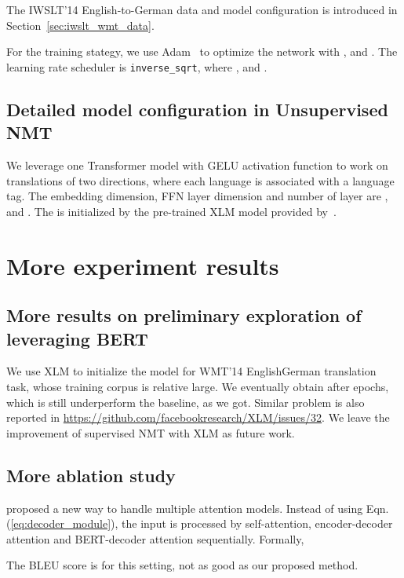 \documentclass{article} \usepackage{iclr2020_conference,times}
\newcommand{\myeqref}[1]{Eqn.(\ref{#1})}
\begin{document}
The IWSLT'14 English-to-German data and model configuration is introduced in Section~\ref{sec:iwslt_wmt_data}.

For the training stategy, we use Adam~\citep{kingma2014adam} to optimize the network with ,  and . The learning rate scheduler is \texttt{inverse\_sqrt}, where ,  and .




\subsection{Detailed model configuration in Unsupervised NMT}\label{app:unsup}
We leverage one Transformer model with GELU activation function to work on translations of two directions, where each language is associated with a language tag. The embedding dimension, FFN layer dimension and number of layer are ,  and . The  is initialized by the pre-trained XLM model provided by~\citep{lample2019cross}. 

\section{More experiment results}

\subsection{More results on preliminary exploration of leveraging BERT}\label{app:more_results_xlm}
We use XLM to initialize the model for WMT'14 EnglishGerman translation task, whose training corpus is relative large. We eventually obtain  after  epochs, which is still underperform the baseline,  as we got. Similar problem is also reported in \url{https://github.com/facebookresearch/XLM/issues/32}. We leave the improvement of supervised NMT with XLM as future work.

\subsection{More ablation study}\label{app:more-ablation-study}


\cite{junczys2018ms} proposed a new way to handle multiple attention models. Instead of using \myeqref{eq:decoder_module}, the input is processed by self-attention, encoder-decoder attention and BERT-decoder attention sequentially. Formally,

The BLEU score is  for this setting, not as good as our proposed method.
\end{document}

